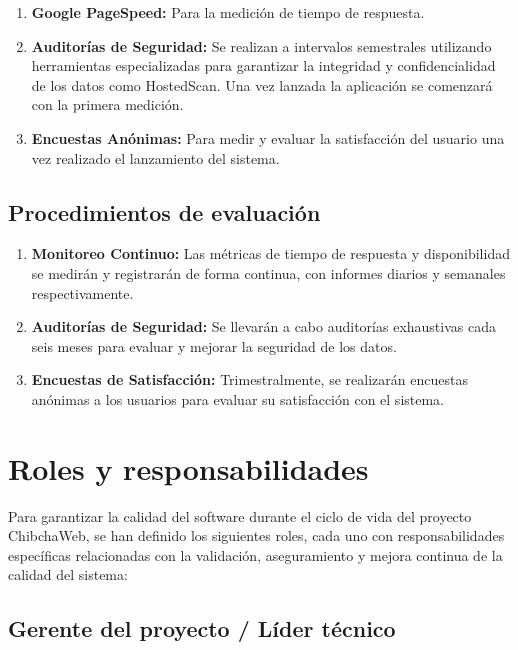 \documentclass[12pt,a4paper]{article}
\begin{document}
\begin{enumerate}
  \item \textbf{Google PageSpeed:} Para la medición de tiempo de respuesta.
  \item \textbf{Auditorías de Seguridad:} Se realizan a intervalos semestrales utilizando
        herramientas especializadas para garantizar la integridad y confidencialidad de los
        datos como HostedScan. Una vez lanzada la aplicación se comenzará con la primera
        medición.
  \item \textbf{Encuestas Anónimas:} Para medir y evaluar la satisfacción del usuario una vez
        realizado el lanzamiento del sistema.
\end{enumerate}

\subsection{Procedimientos de evaluación}

\begin{enumerate}
  \item \textbf{Monitoreo Continuo:} Las métricas de tiempo de respuesta y disponibilidad se
        medirán y registrarán de forma continua, con informes diarios y semanales
        respectivamente.
  \item \textbf{Auditorías de Seguridad:} Se llevarán a cabo auditorías exhaustivas cada seis meses
        para evaluar y mejorar la seguridad de los datos.
  \item \textbf{Encuestas de Satisfacción:} Trimestralmente, se realizarán encuestas anónimas a los
        usuarios para evaluar su satisfacción con el sistema.
\end{enumerate}

\section{Roles y responsabilidades}

Para garantizar la calidad del software durante el ciclo de vida del proyecto ChibchaWeb, se
han definido los siguientes roles, cada uno con responsabilidades específicas relacionadas con
la validación, aseguramiento y mejora continua de la calidad del sistema:

\subsection{Gerente del proyecto / Líder técnico}
\end{document}
